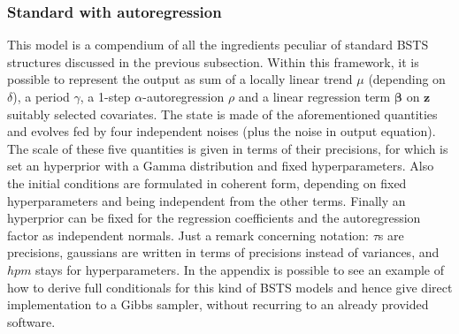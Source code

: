 \documentclass[11pt,twoside]{report}
\begin{document}
\subsubsection{Standard with autoregression}
This model is a compendium of all the ingredients peculiar of standard BSTS structures discussed in the previous subsection. Within this framework, it is possible to represent the output as sum of a locally linear trend $ \mu $ (depending on $ \delta $), a period $ \gamma $, a 1-step $ \alpha $-autoregression $ \rho $ and a linear regression term $ \boldsymbol{\beta} $ on $ \mathbf{z}$ suitably selected covariates. The state is made of the aforementioned quantities and evolves fed by four independent noises (plus the noise in output equation). The scale of these five quantities is given in terms of their precisions, for which is set an hyperprior with a Gamma distribution and fixed hyperparameters. Also the initial conditions are formulated in coherent form, depending on fixed hyperparameters and being independent from the other terms. Finally an hyperprior can be fixed for the regression coefficients and the autoregression factor as independent normals. Just a remark concerning  notation: $ \tau $s are precisions, gaussians are written in terms of precisions instead of variances, and $ hpm $ stays for hyperparameters. In the appendix is possible to see an example of how to derive full conditionals for this kind of BSTS models and hence give direct implementation to a Gibbs sampler, without recurring to an already provided software.
\end{document}
